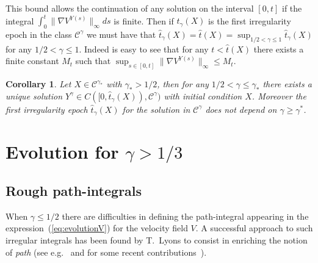 \documentclass[a4paper,12pt,reqno]{amsart}
\newtheorem{corollary}{Corollary}
\newcommand{\CC}{\mathscr{C}}
\begin{document}
This bound allows the continuation of any solution on the interval
$[0,t]$ if the integral $\int_0^t \|\nabla V^{Y(s)}\|_\infty ds$ is
finite. Then if  $\hat t_\gamma(X)$ is the first irregularity epoch
in the class $\CC^\gamma$ we must have that $\hat t_\gamma(X) =
\hat t(X) = \sup_{1/2 < \gamma \le 1} \hat t_\gamma(X)$ for any $1/2 < \gamma \le 1$. Indeed is easy to see that
for any $t < \hat t(X)$ there exists a finite constant
$M_t$ such that $\sup_{s \in [0,t]}\|\nabla V^{Y(s)}\|_\infty \le M_t$.

\begin{corollary}
Let $X \in \CC^{\gamma_*}$ with $\gamma_* > 1/2$, then
for any $1/2 < \gamma \le \gamma_*$ there exists a unique solution $Y^\gamma
\in C([0,\hat t_\gamma(X)),\CC^\gamma)$
with initial condition $X$. Moreover the first irregularity epoch $\hat t_\gamma(X)$ for the solution in
$\CC^\gamma$ does not depend on $\gamma \ge \gamma^*$.
\end{corollary}






\section{Evolution for $\gamma > 1/3$}
\label{sec:rough}


\subsection{Rough path-integrals}
When $\gamma \le 1/2$ there are difficulties in defining the
path-integral appearing in the expression~(\ref{eq:evolutionV}) for
the velocity field $V$. A successful
approach to such irregular integrals has been found by T.~Lyons to
consist in enriching the notion of \emph{path} (see
e.g.~\cite{LyonsBook,Lyons} and for some recent contributions~\cite{friz,Gubinelli,feyel}).
\end{document}
